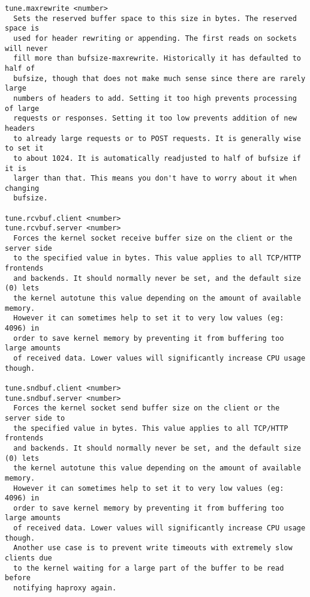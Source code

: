 \begin{verbatim}
tune.maxrewrite <number>
  Sets the reserved buffer space to this size in bytes. The reserved space is
  used for header rewriting or appending. The first reads on sockets will never
  fill more than bufsize-maxrewrite. Historically it has defaulted to half of
  bufsize, though that does not make much sense since there are rarely large
  numbers of headers to add. Setting it too high prevents processing of large
  requests or responses. Setting it too low prevents addition of new headers
  to already large requests or to POST requests. It is generally wise to set it
  to about 1024. It is automatically readjusted to half of bufsize if it is
  larger than that. This means you don't have to worry about it when changing
  bufsize.

tune.rcvbuf.client <number>
tune.rcvbuf.server <number>
  Forces the kernel socket receive buffer size on the client or the server side
  to the specified value in bytes. This value applies to all TCP/HTTP frontends
  and backends. It should normally never be set, and the default size (0) lets
  the kernel autotune this value depending on the amount of available memory.
  However it can sometimes help to set it to very low values (eg: 4096) in
  order to save kernel memory by preventing it from buffering too large amounts
  of received data. Lower values will significantly increase CPU usage though.

tune.sndbuf.client <number>
tune.sndbuf.server <number>
  Forces the kernel socket send buffer size on the client or the server side to
  the specified value in bytes. This value applies to all TCP/HTTP frontends
  and backends. It should normally never be set, and the default size (0) lets
  the kernel autotune this value depending on the amount of available memory.
  However it can sometimes help to set it to very low values (eg: 4096) in
  order to save kernel memory by preventing it from buffering too large amounts
  of received data. Lower values will significantly increase CPU usage though.
  Another use case is to prevent write timeouts with extremely slow clients due
  to the kernel waiting for a large part of the buffer to be read before
  notifying haproxy again.


\end{verbatim}

